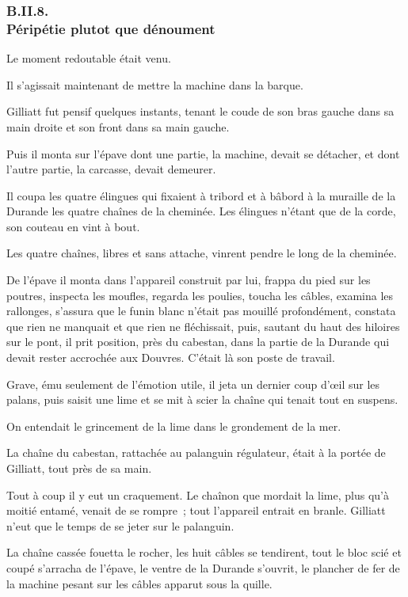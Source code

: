 \documentclass[french,twoside]{book} %
\begin{document}
 \subsubsection[{B.II.8. Péripétie plutot que dénoument}]{B.II.8. \\
Péripétie plutot que dénoument}
\noindent Le moment redoutable était venu.\par
Il s’agissait maintenant de mettre la machine dans la barque.\par
Gilliatt fut pensif quelques instants, tenant le coude de son bras gauche dans sa main droite et son front dans sa main gauche.\par
Puis il monta sur l’épave dont une partie, la machine, devait se détacher, et dont l’autre partie, la carcasse, devait demeurer.\par
Il coupa les quatre élingues qui fixaient à tribord et à bâbord à la muraille de la Durande les quatre chaînes de la cheminée. Les élingues n’étant que de la corde, son couteau en vint à bout.\par
Les quatre chaînes, libres et sans attache, vinrent pendre le long de la cheminée.\par
De l’épave il monta dans l’appareil construit par lui, frappa du pied sur les poutres, inspecta les moufles, regarda les poulies, toucha les câbles, examina les  rallonges, s’assura que le funin blanc n’était pas mouillé profondément, constata que rien ne manquait et que rien ne fléchissait, puis, sautant du haut des hiloires sur le pont, il prit position, près du cabestan, dans la partie de la Durande qui devait rester accrochée aux Douvres. C’était là son poste de travail.\par
Grave, ému seulement de l’émotion utile, il jeta un dernier coup d’œil sur les palans, puis saisit une lime et se mit à scier la chaîne qui tenait tout en suspens.\par
On entendait le grincement de la lime dans le grondement de la mer.\par
La chaîne du cabestan, rattachée au palanguin régulateur, était à la portée de Gilliatt, tout près de sa main.\par
Tout à coup il y eut un craquement. Le chaînon que mordait la lime, plus qu’à moitié entamé, venait de se rompre ; tout l’appareil entrait en branle. Gilliatt n’eut que le temps de se jeter sur le palanguin.\par
La chaîne cassée fouetta le rocher, les huit câbles se tendirent, tout le bloc scié et coupé s’arracha de l’épave, le ventre de la Durande s’ouvrit, le plancher de fer de la machine pesant sur les câbles apparut sous la quille.\par
\end{document}
